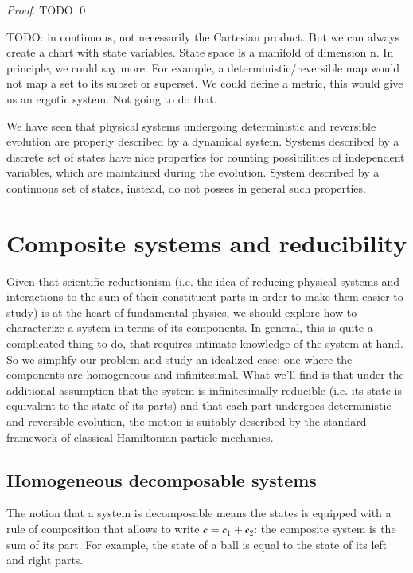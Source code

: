 \documentclass[aps,pra,10pt,twocolumn,floatfix,nofootinbib]{revtex4-1}
\theoremstyle{definition}
\renewenvironment{proof}{\emph{Proof}.}{\qed}
\begin{document}
\begin{proof}
TODO
\end{proof}

TODO: in continuous, not necessarily the Cartesian product. But we can always create a chart with state variables. State space is a manifold of dimension n. In principle, we could say more. For example, a deterministic/reversible map would not map a set to its subset or superset. We could define a metric, this would give us an ergotic system. Not going to do that.

We have seen that physical systems undergoing deterministic and reversible evolution are properly described by a dynamical system. Systems described by a discrete set of states have nice properties for counting possibilities of independent variables, which are maintained during the evolution. System described by a continuous set of states, instead, do not posses in general such properties.

\section{Composite systems and reducibility}


Given that scientific reductionism (i.e. the idea of reducing physical systems and interactions to the sum of their constituent parts in order to make them easier to study) is at the heart of fundamental physics, we should explore how to characterize a system in terms of its components. In general, this is quite a complicated thing to do, that requires intimate knowledge of the system at hand. So we simplify our problem and study an idealized case: one where the components are homogeneous and infinitesimal. What we'll find is that under the additional assumption that the system is infinitesimally reducible (i.e. its state is equivalent to the state of its parts) and that each part undergoes deterministic and reversible evolution, the motion is suitably described by the standard framework of classical Hamiltonian particle mechanics.

\subsection{Homogeneous decomposable systems}
The notion that a system is decomposable means the states is equipped with a rule of composition that allows to write $\mathcal{c}=\mathcal{c}_1+\mathcal{c}_2$: the composite system is the sum of its part. For example, the state of a ball is equal to the state of its left and right parts.
\end{document}
